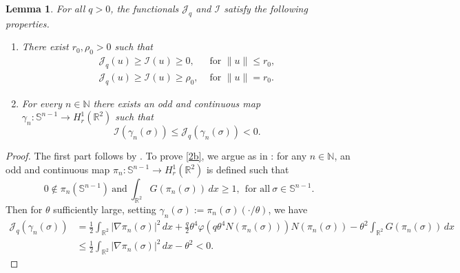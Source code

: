 \documentclass[11pt,leqno,twoside,reqno]{amsart}
\numberwithin{equation}{section}
\newtheorem{lemma}[theorem]{Lemma}
\begin{document}
\begin{lemma}\label{JI}
For all $q>0$, the functionals $\mathcal J_{q}$ and $\mathcal I$ satisfy the following properties.
\begin{enumerate}[label=(\roman*),ref=\roman*]
\item \label{i35}There exist $r_{0}, \rho_{0}>0$ such that
\begin{align*}
\mathcal J_{q}(u) {\geqslant} \mathcal I(u){\geqslant} 0,  & \text{ for }  \|u\|{\leqslant} r_{0},\\ 
\mathcal J_{q}(u) {\geqslant} \mathcal I(u){\geqslant}\rho_{0},   &\text{ for } \|u\|= r_{0}. 
\end{align*}
\item For every $n\in \mathbb N$ there exists an odd and continuous map $\gamma_{n}: \mathbb S^{n-1}\to H^{1}_{r}(\mathbb R^{2})$ 
such that
\begin{equation}\label{2b} 
\mathcal I(\gamma_{n}(\sigma)){\leqslant} \mathcal J_{q}(\gamma_{n}(\sigma))<0.
\end{equation}
\end{enumerate}
\end{lemma}

\begin{proof}
The first part follows by \cite[Lemma 2.4]{HIT}.
To prove \eqref{2b}, we argue as in \cite[Theorem 10]{BL2}: for any $n\in \mathbb{N}$, 
an odd and continuous 
map $\pi_n: \mathbb S^{n-1}\rightarrow H_r^1(\mathbb{R}^2)$ is defined such that
\begin{equation*} 0\notin \pi_{n}(\mathbb S^{n-1})\ \mbox{and} \ \int_{\mathbb{R}^2} G(\pi_{n}(\sigma))\,dx{\geqslant} 1,\ \ \mbox{for all}
\ \sigma\in\mathbb S^{n-1}.
\end{equation*}
Then for $\theta$ sufficiently large, setting $\gamma_n(\sigma):= \pi_n(\sigma)(\cdot/\theta)$, we have
\begin{align*}
\mathcal J_q(\gamma_n(\sigma))
&=\frac{1}{2}\int_{\mathbb{R}^2}|\nabla \pi_n(\sigma)|^2\,dx+\frac{q}{2}\theta^4\varphi( q\theta^4 N(\pi_n(\sigma)))
N(\pi_n(\sigma)) -\theta^2\int_{\mathbb{R}^2}G(\pi_n(\sigma))\,dx\\
&{\leqslant} \frac{1}{2}\int_{\mathbb{R}^2}|\nabla \pi_n(\sigma)|^2\,dx -\theta^2<0.
\end{align*}
\end{proof}
\end{document}
